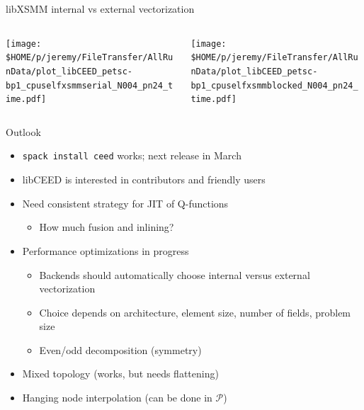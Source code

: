 \documentclass[aspectratio=1610]{beamer}
\begin{document}
\begin{frame}{libXSMM internal vs external vectorization}
  \begin{columns}
    \begin{column}{0.5\textwidth}
      \texttt{[image: \$HOME/p/jeremy/FileTransfer/AllRunData/plot\_libCEED\_petsc-bp1\_cpuselfxsmmserial\_N004\_pn24\_time.pdf]}
    \end{column}
    \begin{column}{0.5\textwidth}
      \texttt{[image: \$HOME/p/jeremy/FileTransfer/AllRunData/plot\_libCEED\_petsc-bp1\_cpuselfxsmmblocked\_N004\_pn24\_time.pdf]}
    \end{column}
  \end{columns}
\end{frame}



\begin{frame}{Outlook}
  \begin{itemize}
  \item \texttt{spack install ceed} works; next release in March
  \item libCEED is interested in contributors and friendly users
  \item Need consistent strategy for JIT of Q-functions
    \begin{itemize}
    \item How much fusion and inlining?
    \end{itemize}
  \item Performance optimizations in progress
    \begin{itemize}
    \item Backends should automatically choose internal versus external vectorization
    \item Choice depends on architecture, element size, number of fields, problem size
    \item Even/odd decomposition (symmetry)
    \end{itemize}
  \item Mixed topology (works, but needs flattening)
  \item Hanging node interpolation (can be done in $\mathcal{P}$)
  \end{itemize}
\end{frame}
\end{document}
